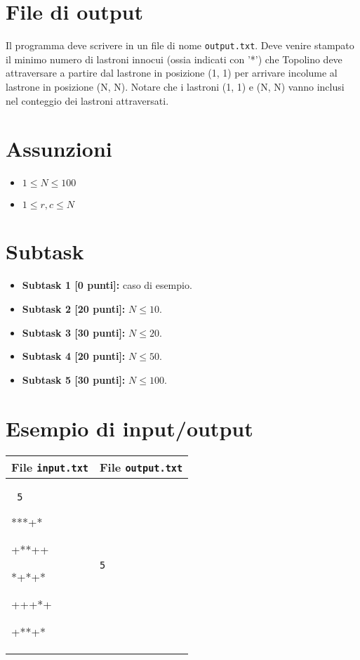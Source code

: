 \documentclass[a4paper,11pt]{article}
\newcommand{\file}[1]{\texttt{#1}}
\newcommand{\esempio}[2]{
\noindent\begin{minipage}{\textwidth}
\begin{tabular}{|p{11cm}|p{5cm}|}
	\hline
	\textbf{File \file{input.txt}} & \textbf{File \file{output.txt}}\\
	\hline
	\tt \small #1 &
	\tt \small #2 \\
	\hline
\end{tabular}
\end{minipage}
}
\begin{document}
\section*{File di output}
Il programma deve scrivere in un file di nome \file{output.txt}. Deve venire stampato il minimo numero di lastroni innocui (ossia indicati con '*') che Topolino deve attraversare a partire dal
lastrone in posizione (1, 1) per arrivare incolume al lastrone in posizione (N, N). Notare che i
lastroni (1, 1) e (N, N) vanno inclusi nel conteggio dei lastroni attraversati.

\section*{Assunzioni}
\begin{itemize}
\item $1 \leq N \leq 100$
\item $1 \leq r,c \leq N$
\end{itemize}

\section*{Subtask}
\begin{itemize}
\item \textbf{Subtask 1 [\phantom{1}0 punti]:} caso di esempio.
\item \textbf{Subtask 2 [20 punti]:} $N \le 10$.
\item \textbf{Subtask 3 [30 punti]:} $N \le 20$.
\item \textbf{Subtask 4 [20 punti]:} $N \le 50$.
\item \textbf{Subtask 5 [30 punti]:} $N \le 100$.
\end{itemize}


\section*{Esempio di input/output}
\esempio{
5

***+*

+**++

*+*+*

+++*+

+**+*
}{5}
\end{document}

